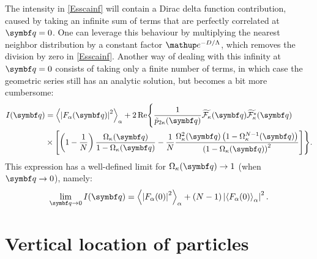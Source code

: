 The intensity in \cref{Esscainf} will contain a Dirac delta function contribution, caused by taking an infinite sum of terms that are perfectly correlated at $\q = 0$. One can leverage this behaviour by multiplying the nearest neighbor distribution by a constant factor $\e^{-D/\Lambda}$, which removes the division by zero in \cref{Esscainf}.
Another way of dealing with this infinity at $\q =0$ consists of taking only a finite number of terms, in which case the geometric series still has an analytic solution, but becomes a bit more cumbersome:
\begin{equation*}
\begin{split}
  I(\q ) &= {\bra\left| F_\alpha(\q ) \right| ^2\ket}_\alpha
   + 2 \Re \Biggl\lbrace \frac{1}{\tilde{p}_{2\kappa}(\q )}\widetilde{\curlf_\kappa}(\q )\widetilde{\curlf_\kappa^*}(\q ) \\
  & \times \left[ \left( 1 - \frac{1}{N}\right) \frac{\Omega_\kappa(\q )}{1 - \Omega_\kappa(\q ) } - \frac{1}{N}\frac{\Omega_\kappa^2(\q )\left( 1- \Omega_\kappa^{N-1}(\q )\right) }{\left( 1 - \Omega_\kappa(\q ) \right) ^2 } \right] \Biggr\rbrace.
\end{split}
\end{equation*}
This expression has a well-defined limit for $\Omega_\kappa(\q ) \rightarrow 1$ (when $\q \rightarrow 0$), namely:
\begin{equation*}
  \lim_{\q \rightarrow 0} I(\q ) = {\bra\left| F_\alpha(0 ) \right| ^2\ket}_{\alpha} + \left( N-1 \right) \left| {\bra F_\alpha(0 )\ket}_{\alpha} \right|^2.
\end{equation*}


\section{Vertical location of particles}


